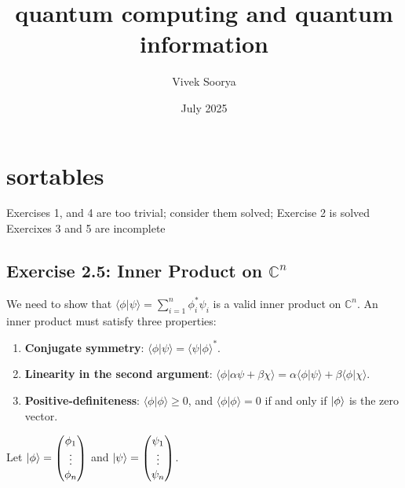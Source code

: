 \documentclass[14pt]{extarticle}
\title{quantum computing and quantum information}
\author{Vivek Soorya}
\date{July 2025}
\begin{document}
\maketitle
\section{sortables}
Exercises 1, and 4 are too trivial; consider them solved;
Exercise 2 is solved
Exercixes 3 and 5 are incomplete


\subsection*{Exercise 2.5: Inner Product on $\mathbb{C}^n$}
We need to show that $\langle \phi | \psi \rangle = \sum_{i=1}^n \phi_i^* \psi_i$ is a valid inner product on $\mathbb{C}^n$. An inner product must satisfy three properties:
\begin{enumerate}
    \item \textbf{Conjugate symmetry}: $\langle \phi | \psi \rangle = \langle \psi | \phi \rangle^*$.
    \item \textbf{Linearity in the second argument}: $\langle \phi | \alpha \psi + \beta \chi \rangle = \alpha \langle \phi | \psi \rangle + \beta \langle \phi | \chi \rangle$.
    \item \textbf{Positive-definiteness}: $\langle \phi | \phi \rangle \ge 0$, and $\langle \phi | \phi \rangle = 0$ if and only if $\ket{\phi}$ is the zero vector.
\end{enumerate}
Let $\ket{\phi} = \begin{pmatrix} \phi_1 \\ \vdots \\ \phi_n \end{pmatrix}$ and $\ket{\psi} = \begin{pmatrix} \psi_1 \\ \vdots \\ \psi_n \end{pmatrix}$.
\end{document}
